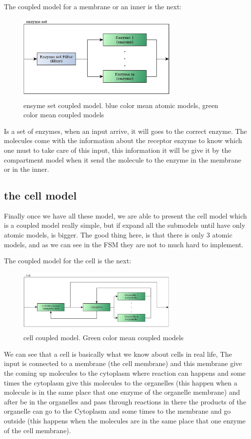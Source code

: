 \documentclass[12pt]{article}
\begin{document}
The coupled model for a membrane or an inner is the next:

\begin{figure}[h!]
 \centering
  \includegraphics[width=300px]{coupled-enzyme-set.jpg}
 \caption{ensyme set coupled model. blue color mean atomic models, green color mean coupled models}
\end{figure}

Is a set of enzymes, when an input arrive, it will goes to the correct enzyme. The molecules come with the information about the receptor enzyme to know which one must to take care of this input, this information it will be give it by the compartment model when it send the molecule to the enzyme in the membrane or in the inner.

\subsection*{the cell model}
Finally once we have all these model, we are able to present the cell model which is a coupled model really simple, but if expand all the submodels until have only atomic models, is bigger. The good thing here, is that there is only 3 atomic models, and as we can see in the FSM they are not to much hard to implement.

\newpage
The coupled model for the cell is the next:

\begin{figure}[h!]
 \centering
  \includegraphics[width=300px]{coupled-cell.jpg}
 \caption{cell coupled model. Green color mean coupled models}
\end{figure}

We can see that a cell is basically what we know about cells in real life, The input is connected to a membrane (the cell membrane) and this membrane give the coming up molecules to the cytoplasm where reaction can happens and some times the cytoplasm give this molecules to the organelles (this happen when a molecule is in the same place that one enzyme of the organelle membrane) and after be in the organelles and pass through reactions in there the products of the organelle can go to the Cytoplasm and some times to the membrane and go outside (this happens when the molecules are in the same place that one enzyme of the cell membrane).
\end{document}
